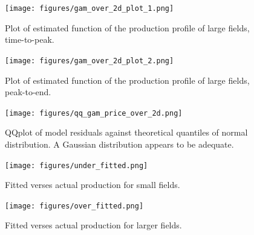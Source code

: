 \documentclass[11pt]{article}
\begin{document}
\begin{spacing}{1}
\begin{figure}
	\texttt{[image: figures/gam\_over\_2d\_plot\_1.png]}
	\caption{Plot of estimated function of the production profile of large fields, time-to-peak.}
	\label{chart:gam_over_2d_plot_1}
\end{figure}

\begin{figure}
	\texttt{[image: figures/gam\_over\_2d\_plot\_2.png]}
	\caption{Plot of estimated function of the production profile of large fields, peak-to-end.}
	\label{chart:gam_over_2d_plot_2}
\end{figure}

\begin{figure}
	\texttt{[image: figures/qq\_gam\_price\_over\_2d.png]}
	\caption{QQplot of model residuals against theoretical quantiles of normal distribution.  A Gaussian distribution appears to be adequate.}
	\label{chart:qqplot}
\end{figure}

\begin{figure}
	\texttt{[image: figures/under\_fitted.png]}
	\caption{Fitted verses actual production for small fields.}
	\label{chart:under_fitted}
\end{figure}

\begin{figure}
	\texttt{[image: figures/over\_fitted.png]}
	\caption{Fitted verses actual production for larger fields.}
	\label{chart:under_fitted}
\end{figure}


\end{spacing}
\end{document}
